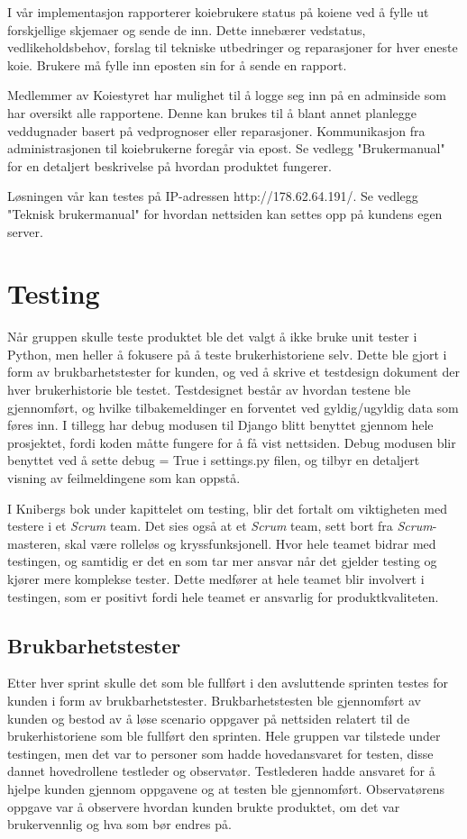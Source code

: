 \documentclass[12pt,a4paper,norsk]{article}
\begin{document}
	I vår implementasjon rapporterer koiebrukere status på koiene ved å fylle ut forskjellige skjemaer og sende de inn. Dette innebærer vedstatus, vedlikeholdsbehov, forslag til tekniske utbedringer og reparasjoner for hver eneste koie. Brukere må fylle inn eposten sin for å sende en rapport.
	
	Medlemmer av Koiestyret har mulighet til å logge seg inn på en adminside som har oversikt alle rapportene. Denne kan brukes til å blant annet planlegge veddugnader basert på vedprognoser eller reparasjoner. Kommunikasjon fra administrasjonen til koiebrukerne foregår via epost. Se vedlegg "Brukermanual" for en detaljert beskrivelse på hvordan produktet fungerer. 
	
	Løsningen vår kan testes på IP-adressen http://178.62.64.191/. Se vedlegg "Teknisk brukermanual" for hvordan nettsiden kan settes opp på kundens egen server.
	
	\section{Testing}
Når gruppen skulle teste produktet ble det valgt å ikke bruke unit tester i Python, men heller å fokusere på å teste brukerhistoriene selv. Dette ble gjort i form av brukbarhetstester for kunden, og ved å skrive et testdesign dokument der hver brukerhistorie ble testet. Testdesignet består av hvordan testene ble gjennomført, og hvilke tilbakemeldinger en forventet ved gyldig/ugyldig data som føres inn.
I tillegg har debug modusen til Django blitt benyttet gjennom hele prosjektet, fordi koden måtte fungere for å få vist nettsiden. Debug modusen blir benyttet ved å sette debug = True i settings.py filen, og tilbyr en detaljert visning av feilmeldingene som kan oppstå.

I Knibergs bok under kapittelet om testing\cite[side 128-131]{kniberg}, blir det fortalt om viktigheten med testere i et \textit{Scrum} team. Det sies også at et \textit{Scrum} team, sett bort fra \textit{Scrum}-masteren, skal være rolleløs og kryssfunksjonell. Hvor hele teamet bidrar med testingen, og samtidig er det en som tar mer ansvar når det gjelder testing og kjører mere komplekse tester. Dette medfører at hele teamet blir involvert i testingen, som er positivt fordi hele teamet er ansvarlig for produktkvaliteten.

 \subsection{Brukbarhetstester}
Etter hver sprint skulle det som ble fullført i den avsluttende sprinten testes for kunden i form av brukbarhetstester. Brukbarhetstesten ble gjennomført av kunden og bestod av å løse scenario oppgaver på nettsiden relatert til de brukerhistoriene som ble fullført den sprinten. Hele gruppen var tilstede under testingen, men det var to personer som hadde hovedansvaret for testen, disse dannet hovedrollene testleder og observatør. Testlederen hadde ansvaret for å hjelpe kunden gjennom oppgavene og at testen ble gjennomført. Observatørens oppgave var å observere hvordan kunden brukte produktet, om det var brukervennlig og hva som bør endres på.
\end{document}
